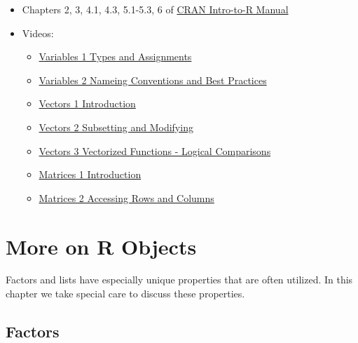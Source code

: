 \documentclass[
]{book}
\providecommand{\tightlist}{%
  \setlength{\itemsep}{0pt}\setlength{\parskip}{0pt}}
\begin{document}
\begin{itemize}
\tightlist
\item
  Chapters 2, 3, 4.1, 4.3, 5.1-5.3, 6 of \href{https://cran.r-project.org/doc/manuals/r-release/R-intro.pdf}{CRAN Intro-to-R Manual}
\item
  Videos:

  \begin{itemize}
  \tightlist
  \item
    \href{https://ucr.yuja.com/V/Video?v=2368642\&node=8487537\&a=1529691043\&autoplay=1}{Variables 1 \textbar{} Types and Assignments}
  \item
    \href{https://ucr.yuja.com/V/Video?v=2368641\&node=8487536\&a=957339369\&autoplay=1}{Variables 2 \textbar{} Nameing Conventions and Best Practices}
  \item
    \href{https://ucr.yuja.com/V/Video?v=2368859\&node=8488053\&a=283774152\&autoplay=1}{Vectors 1 \textbar{} Introduction}
  \item
    \href{https://ucr.yuja.com/V/Video?v=2368857\&node=8488051\&a=1465899289\&autoplay=1}{Vectors 2 \textbar{} Subsetting and Modifying}
  \item
    \href{https://ucr.yuja.com/V/Video?v=2368856\&node=8488050\&a=612212822\&autoplay=1}{Vectors 3 \textbar{} Vectorized Functions - Logical Comparisons}
  \item
    \href{https://ucr.yuja.com/V/Video?v=2368855\&node=8488049\&a=447596964\&autoplay=1}{Matrices 1 \textbar{} Introduction}
  \item
    \href{https://ucr.yuja.com/V/Video?v=2368854\&node=8488047\&a=1529352108\&autoplay=1}{Matrices 2 \textbar{} Accessing Rows and Columns}
  \end{itemize}
\end{itemize}

\hypertarget{more-on-r-objects}{%
\chapter{More on R Objects}\label{more-on-r-objects}}

Factors and lists have especially unique properties that are often utilized. In this chapter we take special care to discuss these properties.

\hypertarget{factors-1}{%
\section{Factors}\label{factors-1}}
\end{document}
